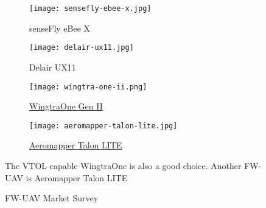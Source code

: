 \begin{figure}[ht]
    \centering
    \begin{subfigure}[b]{0.45\textwidth}
        \texttt{[image: sensefly-ebee-x.jpg]}
        \caption{senseFly eBee X}
        \label{fig:ms-sf-ebee-x}
    \end{subfigure}
    \begin{subfigure}[b]{0.45\textwidth}
        \texttt{[image: delair-ux11.jpg]}
        \caption{Delair UX11}
        \label{fig:ms-delair-ux11}
    \end{subfigure}
    \begin{subfigure}[b]{0.45\textwidth}
        \texttt{[image: wingtra-one-ii.png]}
        \caption{\href{https://wingtra.com/mapping-drone-wingtraone/}{WingtraOne Gen II}}
    \end{subfigure}
    \begin{subfigure}[b]{0.45\textwidth}
        \texttt{[image: aeromapper-talon-lite.jpg]}
        \caption{\href{https://www.aeromao.com/aeromapper-talon-lite/}{Aeromapper Talon LITE}}
    \end{subfigure}
    \caption{FW-UAV Market Survey}
    \label{fig:market-survey-fwuavs}
    The VTOL capable WingtraOne is also a good choice. Another FW-UAV is Aeromapper Talon LITE
\end{figure}


